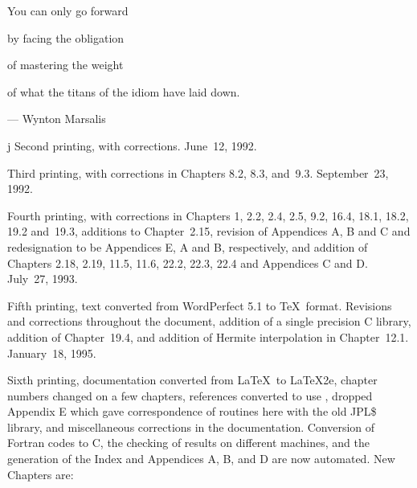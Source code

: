 \documentclass[twoside]{MATH77}
\begin{document}
\begcover
\begin{center}
\begin{minipage}{5.5in}
\vspace{1.4in}
\hspace{1.5in}You can only go forward\vspace{10pt}

\hspace{1.75in}by facing the obligation\vspace{10pt}

\hspace{2in}of mastering the weight\vspace{10pt}

\hspace{1in}of what the titans of the idiom have laid down.\vspace{10pt}

\hspace{2.25in}---  Wynton Marsalis

\if j\outtyp
\vspace{1in}
Second printing, with corrections.  June~12, 1992.\vspace{10pt}

Third printing, with corrections in Chapters 8.2, 8.3, and~9.3.
September~23, 1992.\vspace{10pt}

Fourth printing, with corrections in Chapters 1, 2.2, 2.4, 2.5, 9.2,
16.4, 18.1, 18.2, 19.2 and~19.3, additions to Chapter~2.15, revision
of Appendices A, B and C and redesignation to be Appendices E, A and
B, respectively, and addition of Chapters 2.18, 2.19, 11.5, 11.6,
22.2, 22.3, 22.4 and Appendices C and D.  July~27, 1993.\vspace{10pt}

Fifth printing, text converted from WordPerfect 5.1 to \TeX \ format.
Revisions and corrections throughout the document, addition of a
single precision C library, addition of Chapter~19.4, and addition of
Hermite interpolation in Chapter~12.1. January~18, 1995.\vspace{10pt}

Sixth printing, documentation converted from \LaTeX\ to \LaTeX2e, chapter
numbers changed on a few chapters, references converted to use \BibTeX,
dropped Appendix E which gave correspondence of routines here with the old
JPL\$ library, and miscellaneous corrections in the documentation.
Conversion of Fortran codes to C, the checking of results on different
machines, and the generation of the Index and Appendices A, B, and D are
now automated. New Chapters are:\\[-17pt]
\fi
\end{minipage} \end{center}
\end{document}
